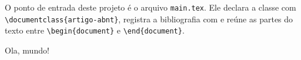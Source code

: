 O ponto de entrada deste projeto é o arquivo \texttt{main.tex}. Ele declara a classe com \lstinline|\documentclass{artigo-abnt}|, registra a bibliografia com \lstinline|| e reúne as partes do texto entre \lstinline|\begin{document}| e \lstinline|\end{document}|.
\begin{document}
Ola, mundo!
\end{document}
